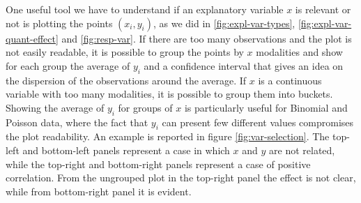 \documentclass[a4paper, twoside, openright, 12pt]{report}
\let\origfigure\figure
\let\endorigfigure\endfigure
\renewenvironment{figure}[1][2] {
  \expandafter\origfigure\expandafter[!hbtp]
} {
  \endorigfigure
}
\theoremstyle{definition}
\theoremstyle{definition}
\theoremstyle{definition}
\theoremstyle{remark}
\begin{document}
One useful tool we have to understand if an explanatory variable \(x\) is relevant or not is plotting the points \((x_i, y_i)\), as we did in \ref{fig:expl-var-types}, \ref{fig:expl-var-quant-effect} and \ref{fig:resp-var}. If there are too many observations and the plot is not easily readable, it is possible to group the points by \(x\) modalities and show for each group the average of \(y_i\) and a confidence interval that gives an idea on the dispersion of the observations around the average. If \(x\) is a continuous variable with too many modalities, it is possible to group them into buckets. Showing the average of \(y_i\) for groups of \(x\) is particularly useful for Binomial and Poisson data, where the fact that \(y_i\) can present few different values compromises the plot readability. An example is reported in figure \ref{fig:var-selection}. The top-left and bottom-left panels represent a case in which \(x\) and \(y\) are not related, while the top-right and bottom-right panels represent a case of positive correlation. From the ungrouped plot in the top-right panel the effect is not clear, while from bottom-right panel it is evident.







\begin{figure}[!hbtp]

{\centering {}\newline{}

}

\caption[Explanatory variable effect evaluation.]{Explanatory variable effect evaluation. The top-left and bottom-left panels represent a case in which \(x\) and \(y\) are not related, while the top-right and bottom-right panels represent a case of positive correlation. From the ungrouped plot in the top-right panel the effect is not clear, while from bottom-right panel it is evident.}\label{fig:var-selection}
\end{figure}
\end{document}
